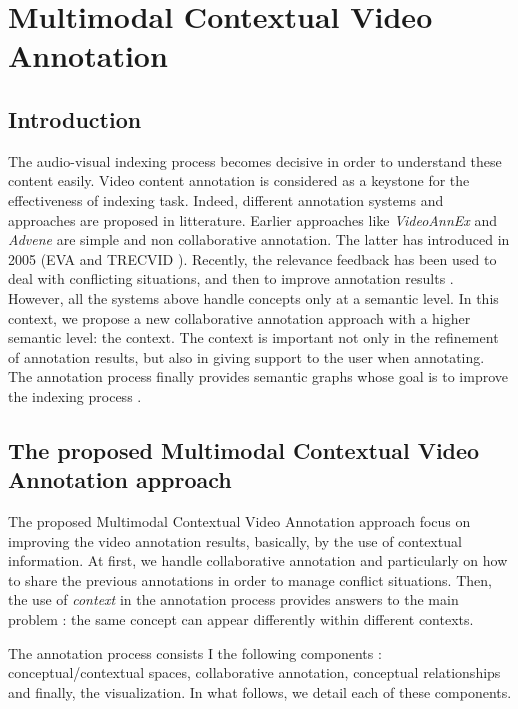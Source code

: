 \chapter{Multimodal Contextual Video Annotation}
\minitoc

\section{Introduction}
The audio-visual indexing process becomes decisive in order to understand these content easily. Video content annotation is considered as a keystone for the effectiveness of indexing task. Indeed,  different annotation systems and approaches are proposed in litterature.
Earlier approaches like \textit{VideoAnnEx} \cite{Schroeter2004} and \textit{Advene}
\cite{Aubert2005} are simple and non collaborative annotation. The latter has introduced in 2005 (EVA \cite{Volkmer2005} and TRECVID \cite{Ayache2007}). Recently, the relevance feedback has been used to deal with conflicting situations, and then to improve annotation results \cite{Ksibi2011}. However, all the systems above handle concepts only at a semantic level. In this context, we propose a new collaborative annotation approach with a higher semantic
level: the context. The context is important not only in the refinement of annotation results, but also in giving support
to the user when annotating. The annotation process finally provides semantic graphs whose goal is to improve the indexing process \cite{Elleuch2011,Koetters2009,Jiang2009b}. 


\section{The proposed Multimodal Contextual Video Annotation approach}

The proposed Multimodal Contextual Video Annotation approach focus on improving the video annotation results, basically, by the use of contextual information. At first, we handle collaborative annotation and particularly on how to share the previous annotations in order to manage conflict situations. Then, the use of \textit{context} in the annotation process provides answers to the main problem : the same concept can appear differently within different contexts. 

The annotation process consists I  the following components : conceptual/contextual spaces, collaborative annotation, conceptual relationships and finally, the visualization. In what follows, we detail each of these components.


